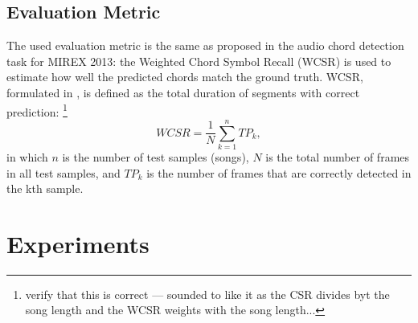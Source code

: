 \documentclass{article}
\begin{document}
\subsection{Evaluation Metric}
The used evaluation metric is the same as proposed in the audio chord detection task for MIREX 2013: the Weighted Chord Symbol Recall (WCSR) is used to estimate how well the predicted chords match the ground truth. WCSR, formulated in , is defined as the total duration of segments with correct prediction: \footnote{verify that this is correct --- sounded to like it as the CSR divides byt the song length and the WCSR weights with the song length...}  
\begin{equation}\label{csr}
WCSR = \frac{1}{N} \sum_{k=1}^n TP_{k},
\end{equation}
in which $n$ is the number of test samples (songs), $N$ is the total number of frames in all test samples, and $TP_{k}$ is the number of frames that are correctly detected in the kth sample. 

\section{Experiments}
\end{document}
